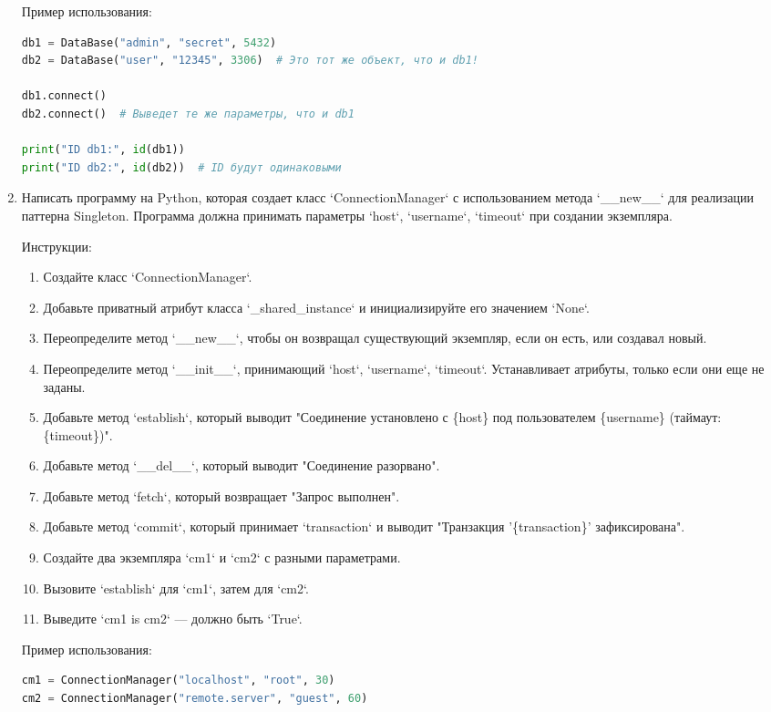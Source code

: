 \begin{enumerate}
Пример использования:
\begin{lstlisting}[language=Python]
db1 = DataBase("admin", "secret", 5432)
db2 = DataBase("user", "12345", 3306)  # Это тот же объект, что и db1!

db1.connect()
db2.connect()  # Выведет те же параметры, что и db1

print("ID db1:", id(db1))
print("ID db2:", id(db2))  # ID будут одинаковыми
\end{lstlisting}

\item Написать программу на Python, которая создает класс `ConnectionManager` с использованием метода `\_\_new\_\_` для реализации паттерна Singleton. Программа должна принимать параметры `host`, `username`, `timeout` при создании экземпляра.

Инструкции:
\begin{enumerate}
    \item Создайте класс `ConnectionManager`.
    \item Добавьте приватный атрибут класса `\_shared\_instance` и инициализируйте его значением `None`.
    \item Переопределите метод `\_\_new\_\_`, чтобы он возвращал существующий экземпляр, если он есть, или создавал новый.
    \item Переопределите метод `\_\_init\_\_`, принимающий `host`, `username`, `timeout`. Устанавливает атрибуты, только если они еще не заданы.
    \item Добавьте метод `establish`, который выводит "Соединение установлено с \{host\} под пользователем \{username\} (таймаут: \{timeout\})".
    \item Добавьте метод `\_\_del\_\_`, который выводит "Соединение разорвано".
    \item Добавьте метод `fetch`, который возвращает "Запрос выполнен".
    \item Добавьте метод `commit`, который принимает `transaction` и выводит "Транзакция '\{transaction\}' зафиксирована".
    \item Создайте два экземпляра `cm1` и `cm2` с разными параметрами.
    \item Вызовите `establish` для `cm1`, затем для `cm2`.
    \item Выведите `cm1 is cm2` — должно быть `True`.
\end{enumerate}

Пример использования:
\begin{lstlisting}[language=Python]
cm1 = ConnectionManager("localhost", "root", 30)
cm2 = ConnectionManager("remote.server", "guest", 60)


\end{lstlisting}
\end{enumerate}
